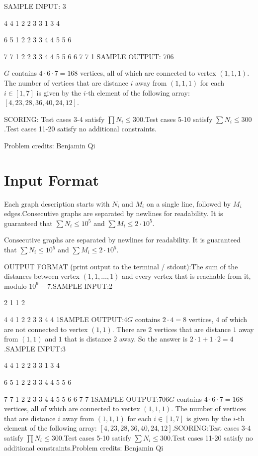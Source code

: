\documentclass[12pt]{article}
\begin{document}
SAMPLE INPUT:
3

4 4
1 2
2 3
3 1
3 4

6 5
1 2
2 3
3 4
4 5
5 6

7 7
1 2
2 3
3 4
4 5
5 6
6 7
7 1
SAMPLE OUTPUT: 
706

$G$ contains $4\cdot 6\cdot 7=168$ vertices, all of which are connected to
vertex $(1,1,1)$.  The number of vertices that are distance $i$ away from
$(1,1,1)$ for each $i\in [1,7]$ is given by the $i$-th element of the following
array:
$[4,23,28,36,40,24,12]$.

SCORING:
Test cases 3-4 satisfy $\prod N_i\le 300$.Test cases 5-10 satisfy $\sum N_i\le 300$.Test cases 11-20 satisfy no additional constraints.


Problem credits: Benjamin Qi



\section*{Input Format}
Each graph description starts with $N_i$ and $M_i$ on a single line, followed by
$M_i$ edges.Consecutive graphs are separated by newlines for readability. It is guaranteed
that $\sum N_i\le 10^5$ and $\sum M_i\le 2\cdot 10^5$.

Consecutive graphs are separated by newlines for readability. It is guaranteed
that $\sum N_i\le 10^5$ and $\sum M_i\le 2\cdot 10^5$.

OUTPUT FORMAT (print output to the terminal / stdout):The sum of the distances between vertex $(1,1,\ldots,1)$ and every vertex that
is reachable from it, modulo $10^9+7$.SAMPLE INPUT:2

2 1
1 2

4 4
1 2
2 3
3 4
4 1SAMPLE OUTPUT:4$G$ contains $2\cdot 4=8$ vertices, $4$ of which are not connected to vertex
$(1,1)$.  There are $2$ vertices that are distance $1$ away from $(1,1)$ and $1$
that is distance $2$ away. So the answer is $2\cdot 1+1\cdot 2=4$.SAMPLE INPUT:3

4 4
1 2
2 3
3 1
3 4

6 5
1 2
2 3
3 4
4 5
5 6

7 7
1 2
2 3
3 4
4 5
5 6
6 7
7 1SAMPLE OUTPUT:706$G$ contains $4\cdot 6\cdot 7=168$ vertices, all of which are connected to
vertex $(1,1,1)$.  The number of vertices that are distance $i$ away from
$(1,1,1)$ for each $i\in [1,7]$ is given by the $i$-th element of the following
array:
$[4,23,28,36,40,24,12]$.SCORING:Test cases 3-4 satisfy $\prod N_i\le 300$.Test cases 5-10 satisfy $\sum N_i\le 300$.Test cases 11-20 satisfy no additional constraints.Problem credits: Benjamin Qi
\end{document}
